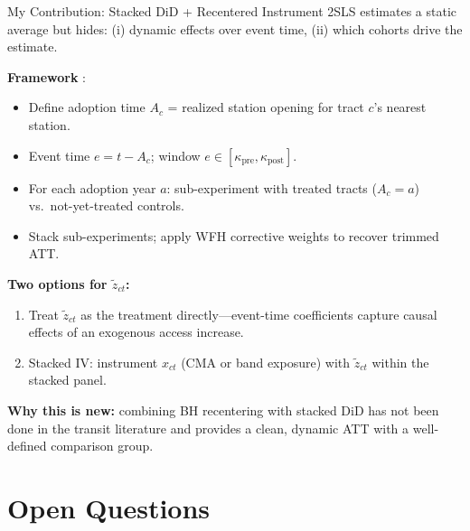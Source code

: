 \documentclass{beamer}
\begin{document}
\begin{frame}{My Contribution: Stacked DiD + Recentered Instrument}
\small
2SLS estimates a static average but hides: (i) dynamic effects over event time,
(ii) which cohorts drive the estimate.

\medskip
\textbf{Framework} \parencite{wing_stacked_2024}:
\begin{itemize}
    \item Define adoption time $A_c$ = realized station opening for tract $c$'s nearest station.
    \item Event time $e = t - A_c$; window $e \in [\kappa_{\text{pre}}, \kappa_{\text{post}}]$.
    \item For each adoption year $a$: sub-experiment with treated tracts ($A_c = a$)
          vs.\ not-yet-treated controls.
    \item Stack sub-experiments; apply WFH corrective weights to recover trimmed ATT.
\end{itemize}

\medskip
\textbf{Two options for $\tilde{z}_{ct}$:}
\begin{enumerate}
    \item Treat $\tilde{z}_{ct}$ as the treatment directly---event-time coefficients
          capture causal effects of an exogenous access increase.
    \item Stacked IV: instrument $x_{ct}$ (CMA or band exposure) with $\tilde{z}_{ct}$
          within the stacked panel.
\end{enumerate}

\medskip
\textbf{Why this is new:} combining BH recentering with stacked DiD has not been done
in the transit literature and provides a clean, dynamic ATT with a well-defined
comparison group.
\end{frame}

\section{Open Questions}
\end{document}
